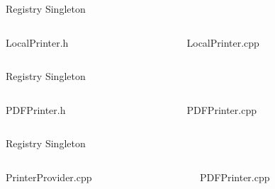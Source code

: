 \documentclass[13pt]{beamer}
\begin{document}
\begin{frame}{Registry Singleton}
\begin{columns}[T]
	\begin{column}{.45\textwidth}
		LocalPrinter.h
		\lstset{basicstyle=\tiny,style=myCustomCppStyle}
		
	\end{column}
	
	\begin{column}{.45\textwidth}
		LocalPrinter.cpp
		\lstset{basicstyle=\tiny,style=myCustomCppStyle}
		
	\end{column}
\end{columns}
\end{frame}

\begin{frame}{Registry Singleton}
\begin{columns}[T]
	\begin{column}{.45\textwidth}
		PDFPrinter.h
		\lstset{basicstyle=\tiny,style=myCustomCppStyle}
		
	\end{column}
	
	\begin{column}{.45\textwidth}
		PDFPrinter.cpp
		\lstset{basicstyle=\tiny,style=myCustomCppStyle}
		
	\end{column}
\end{columns}
\end{frame}

\begin{frame}{Registry Singleton}
\begin{columns}[T]
	\begin{column}{.45\textwidth}
		PrinterProvider.cpp
		\lstset{basicstyle=\tiny,style=myCustomCppStyle}
		
	\end{column}
	
	\begin{column}{.45\textwidth}
		PDFPrinter.cpp
		\lstset{basicstyle=\tiny,style=myCustomCppStyle}
		
	\end{column}
\end{columns}
\end{frame}
\end{document}
